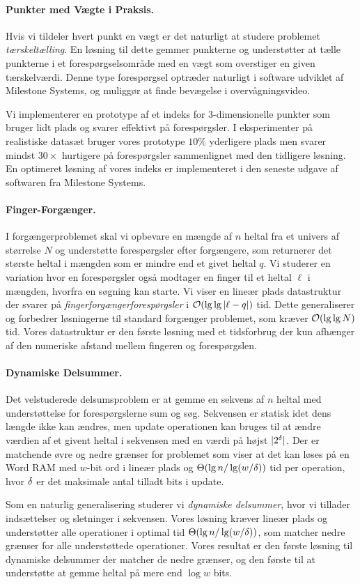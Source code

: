\paragraph{Punkter med Vægte i Praksis.}
Hvis vi tildeler hvert punkt en vægt er det naturligt at studere problemet \emph{tærskeltælling}. En løsning til dette gemmer punkterne og understøtter at tælle punkterne i et forespørgselsområde med en vægt som overstiger en given tærskelværdi. 
Denne type forespørgsel optræder naturligt i software udviklet af Milestone Systems, og muliggør at finde bevægelse i overvågningsvideo.

Vi implementerer en prototype af et indeks for 3-dimensionelle punkter som bruger lidt plads og svarer effektivt på forespørgsler. I eksperimenter på realistiske datasæt bruger vores prototype $10\%$ yderligere plads men svarer mindst $30\times$ hurtigere på forespørgsler sammenlignet med den tidligere løsning. En optimeret løsning af vores indeks er implementeret i den seneste udgave af  softwaren fra Milestone Systems.


\paragraph{Finger-Forgænger.}
I forgængerproblemet skal vi opbevare en mængde af $n$ heltal fra et univers af størrelse $N$ og understøtte forespørgsler efter forgængere, som returnerer det største heltal i mængden som er mindre end et givet heltal $q$. Vi studerer en variation hvor en forespørgsler også modtager en finger til et heltal $\ell$ i mængden, hvorfra en søgning kan starte. Vi viser en lineær plads datastruktur der svarer på \emph{fingerforgængerforespørgsler} i $\mathcal{O}(\lg \lg |\ell-q|)$ tid. Dette generaliserer og forbedrer løsningerne til standard forgænger problemet, som kræver $\mathcal{O}(\lg \lg N)$ tid. Vores datastruktur er den første løsning med et tidsforbrug der kun afhænger af den numeriske afstand mellem fingeren og forespørgslen.


\paragraph{Dynamiske Delsummer.}
Det velstuderede delsumsproblem er at gemme en sekvens af $n$ heltal med understøttelse for forespørgslerne sum og søg. Sekvensen er statisk idet dens længde ikke kan ændres, men update operationen kan bruges til at ændre værdien af et givent heltal i sekvensen med en værdi på højst $|2^\delta|$. 
Der er matchende øvre og nedre grænser for problemet som viser at det kan løses på en Word RAM med $w$-bit ord i lineær plads og $\Theta(\lg n / \lg (w/\delta))$ tid per operation, hvor $\delta$ er det maksimale antal tilladt bits i update.

Som en naturlig generalisering studerer vi \emph{dynamiske delsummer}, hvor vi tillader indsættelser og sletninger i sekvensen. Vores løsning kræver lineær plads og understøtter alle operationer i optimal tid $\Theta(\lg n / \lg (w/\delta))$, som matcher nedre grænser for alle understøttede operationer. Vores resultat er den første løsning til dynamiske delsummer der matcher de nedre grænser, og den første til at understøtte at gemme heltal på mere end $\log w$ bits.

